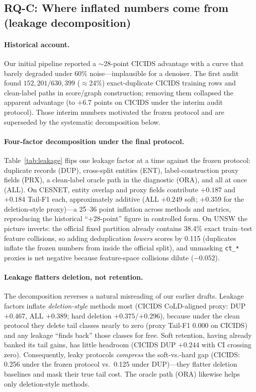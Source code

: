 \documentclass[pdflatex,referee,lineno,sn-basic,Numbered]{sn-jnl}
\begin{document}
\subsection{RQ-C: Where inflated numbers come from (leakage decomposition)}
\label{sec:res-leak}
\paragraph{Historical account.}
Our initial pipeline reported a $\sim$28-point CICIDS advantage with a curve
that barely degraded under 60\% noise---implausible for a denoiser. The first
audit found $152{,}201/630{,}399$ ($\approx$24\%) exact-duplicate CICIDS
training rows and clean-label paths in score/graph construction; removing them
collapsed the apparent advantage (to $+6.7$ points on CICIDS under the interim
audit protocol). Those interim numbers motivated the frozen protocol and are
superseded by the systematic decomposition below.

\paragraph{Four-factor decomposition under the final protocol.}
Table~\ref{tab:leakage} flips one leakage factor at a time against the frozen
protocol: duplicate records (DUP), cross-split entities (ENT),
label-construction proxy fields (PRX), a clean-label oracle path in the
diagnostic (ORA), and all at once (ALL). On CESNET, entity overlap and proxy
fields contribute $+0.187$ and $+0.184$ Tail-F1 each, approximately additive
(ALL $+0.249$ soft; $+0.359$ for the deletion-style proxy)---a 25--36 point
inflation across methods and metrics, reproducing the historical ``+28-point''
figure in controlled form. On UNSW the picture inverts: the official fixed
partition already contains 38.4\% exact train--test feature collisions, so
adding deduplication \emph{lowers} scores by 0.115 (duplicates inflate the
frozen numbers from inside the official split), and unmasking \texttt{ct\_*}
proxies is net negative because feature-space collisions dilute
($-0.052$).



\paragraph{Leakage flatters deletion, not retention.}
The decomposition reverses a natural misreading of our earlier drafts. Leakage
factors inflate \emph{deletion-style} methods most (CICIDS CoLD-aligned proxy:
DUP $+0.467$, ALL $+0.389$; hard deletion $+0.375$/$+0.296$), because under
the clean protocol they delete tail classes nearly to zero (proxy Tail-F1
0.000 on CICIDS) and any leakage ``finds back'' those classes for free. Soft
retention, having already banked its tail gains, has little headroom (CICIDS
DUP $+0.244$ with CI crossing zero). Consequently, leaky protocols
\emph{compress} the soft-vs.-hard gap (CICIDS: 0.256 under the frozen protocol
vs.\ 0.125 under DUP)---they flatter deletion baselines and mask their true
tail cost. The oracle path (ORA) likewise helps only deletion-style methods.
\end{document}
